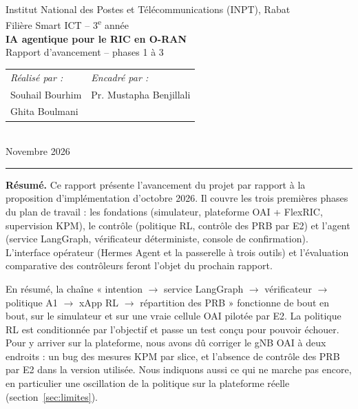 \documentclass[11pt,a4paper]{article}
\begin{document}
\thispagestyle{plain}
\begin{center}
  {\small Institut National des Postes et Télécommunications (INPT), Rabat\\
  Filière Smart ICT -- 3\textsuperscript{e} année}\\[1.2em]
  {\LARGE\bfseries IA agentique pour le RIC en O-RAN}\\[0.4em]
  {\large Rapport d'avancement -- phases 1 à 3}\\[1.2em]
  \begin{tabular}{@{}l@{\hspace{3em}}l@{}}
    \textit{Réalisé par :} & \textit{Encadré par :}\\
    Souhail Bourhim & Pr. Mustapha Benjillali\\
    Ghita Boulmani & \\
  \end{tabular}\\[1em]
  {\small Novembre 2026}
\end{center}
\vspace{0.5em}
\hrule
\vspace{0.8em}

\textbf{Résumé.} Ce rapport présente l'avancement du projet par rapport à la proposition
d'implémentation d'octobre 2026. Il couvre les trois premières phases du plan de travail :
les fondations (simulateur, plateforme OAI + FlexRIC, supervision KPM), le contrôle (politique
RL, contrôle des PRB par E2) et l'agent (service LangGraph, vérificateur déterministe, console
de confirmation). L'interface opérateur (Hermes Agent et la passerelle à trois outils) et
l'évaluation comparative des contrôleurs feront l'objet du prochain rapport.

En résumé, la chaîne « intention $\to$ service LangGraph $\to$ vérificateur $\to$ politique A1
$\to$ xApp RL $\to$ répartition des PRB » fonctionne de bout en bout, sur le simulateur et sur une
vraie cellule OAI pilotée par E2. La politique RL est conditionnée par l'objectif et passe un test
conçu pour pouvoir échouer. Pour y arriver sur la plateforme, nous avons dû corriger le gNB OAI
à deux endroits : un bug des mesures KPM par slice, et l'absence de contrôle des PRB par E2 dans
la version utilisée. Nous indiquons aussi ce qui ne marche pas encore, en particulier une
oscillation de la politique sur la plateforme réelle (section~\ref{sec:limites}).

\end{document}
